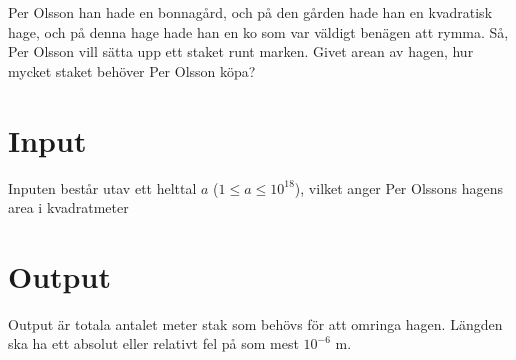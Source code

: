 
%
Per Olsson han hade en bonnagård, och på den gården hade han en kvadratisk
hage, och på denna hage hade han en ko som var väldigt benägen
att rymma. Så, Per Olsson vill sätta upp ett staket runt marken.
Givet arean av hagen, hur mycket staket behöver Per Olsson
köpa?

\section*{Input}

Inputen består utav ett helttal $a$ ($1 \le a \le 10^{18}$), vilket anger Per Olssons
hagens area i kvadratmeter

\section*{Output}

Output är totala antalet meter stak som behövs för att omringa hagen.
Längden ska ha ett absolut eller relativt fel på som mest $10^{-6}$ m.
